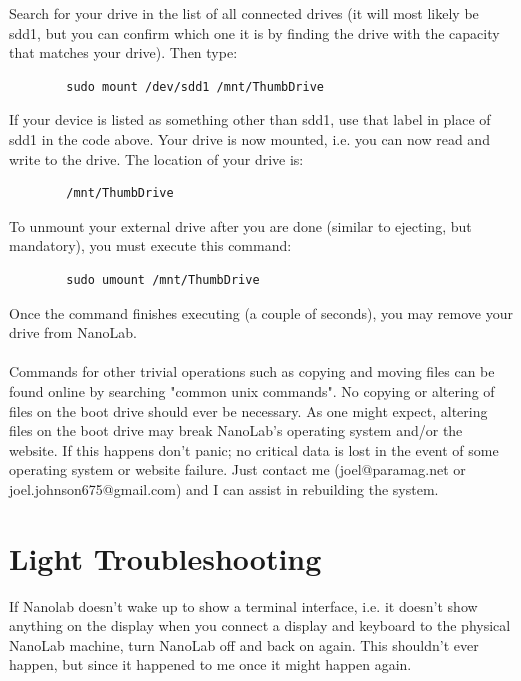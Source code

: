 \documentclass[titlepage]{article}
\begin{document}
        Search for your drive in the list of all connected drives (it will most likely be sdd1, but you can confirm which one it is by finding the drive with the capacity that matches your drive). Then type:
    \\
    
    \begin{verbatim}
        sudo mount /dev/sdd1 /mnt/ThumbDrive
    \end{verbatim}

        If your device is listed as something other than sdd1, use that label in place of sdd1 in the code above. Your drive is now mounted, i.e. you can now read and write to the drive. The location of your drive is:
    \\
    
    \begin{verbatim}
        /mnt/ThumbDrive
    \end{verbatim}
    
        To unmount your external drive after you are done (similar to ejecting, but mandatory), you must execute this command:
    \\
      
    \begin{verbatim}
        sudo umount /mnt/ThumbDrive
    \end{verbatim}

        Once the command finishes executing (a couple of seconds), you may remove your drive from NanoLab.
    \\
        
    \noindent\makebox[\linewidth]{\rule{\textwidth}{0.4pt}}
    \\

    Commands for other trivial operations such as copying and moving files can be found online by searching "common unix commands". No copying or altering of files on the boot drive should ever be necessary. As one might expect, altering files on the boot drive may break NanoLab's operating system and/or the website. If this happens don't panic; no critical data is lost in the event of some operating system or website failure. Just contact me (joel@paramag.net or joel.johnson675@gmail.com) and I can assist in rebuilding the system. 

\section{Light Troubleshooting}

    If Nanolab doesn't wake up to show a terminal interface, i.e. it doesn't show anything on the display when you connect a display and keyboard to the physical NanoLab machine, turn NanoLab off and back on again. This shouldn't ever happen, but since it happened to me once it might happen again.
    \\
        
\end{document}
